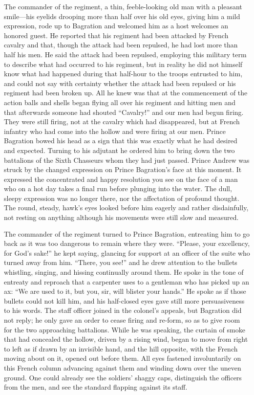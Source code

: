 The commander of the regiment, a thin, feeble-looking old man
with a pleasant smile---his eyelids drooping more than half over
his old eyes, giving him a mild expression, rode up to Bagration
and welcomed him as a host welcomes an honored guest. He reported
that his regiment had been attacked by French cavalry and that,
though the attack had been repulsed, he had lost more than half
his men. He said the attack had been repulsed, employing this
military term to describe what had occurred to his regiment, but
in reality he did not himself know what had happened during that
half-hour to the troops entrusted to him, and could not say with
certainty whether the attack had been repulsed or his regiment
had been broken up. All he knew was that at the commencement of
the action balls and shells began flying all over his regiment
and hitting men and that afterwards someone had shouted
``Cavalry!'' and our men had begun firing. They were still
firing, not at the cavalry which had disappeared, but at French
infantry who had come into the hollow and were firing at our
men. Prince Bagration bowed his head as a sign that this was
exactly what he had desired and expected. Turning to his adjutant
he ordered him to bring down the two battalions of the Sixth
Chasseurs whom they had just passed. Prince Andrew was struck by
the changed expression on Prince Bagration's face at this
moment. It expressed the concentrated and happy resolution you
see on the face of a man who on a hot day takes a final run
before plunging into the water.  The dull, sleepy expression was
no longer there, nor the affectation of profound thought. The
round, steady, hawk's eyes looked before him eagerly and rather
disdainfully, not resting on anything although his movements were
still slow and measured.

The commander of the regiment turned to Prince Bagration,
entreating him to go back as it was too dangerous to remain where
they were. ``Please, your excellency, for God's sake!'' he kept
saying, glancing for support at an officer of the suite who
turned away from him. ``There, you see!''  and he drew attention
to the bullets whistling, singing, and hissing continually around
them. He spoke in the tone of entreaty and reproach that a
carpenter uses to a gentleman who has picked up an ax: ``We are
used to it, but you, sir, will blister your hands.'' He spoke as
if those bullets could not kill him, and his half-closed eyes
gave still more persuasiveness to his words. The staff officer
joined in the colonel's appeals, but Bagration did not reply; he
only gave an order to cease firing and re-form, so as to give
room for the two approaching battalions. While he was speaking,
the curtain of smoke that had concealed the hollow, driven by a
rising wind, began to move from right to left as if drawn by an
invisible hand, and the hill opposite, with the French moving
about on it, opened out before them. All eyes fastened
involuntarily on this French column advancing against them and
winding down over the uneven ground. One could already see the
soldiers' shaggy caps, distinguish the officers from the men, and
see the standard flapping against its staff.

